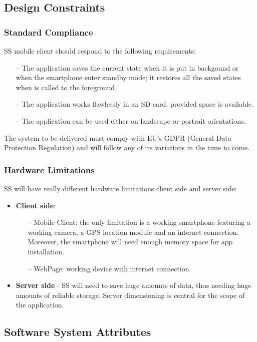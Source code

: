 \subsection{Design Constraints}
	\subsubsection{Standard Compliance}
	SS mobile client should respond to the following requirements:
	\begin{itemize}
		\item[--] The application saves the current state when it is put in backgound or when the smartphone enter standby mode; it restores all the saved states when is called to the foreground.
		\item[--] The application works flawlessly in an SD card, provided space is available.
		\item[--] The application can be used either on landscape or portrait orientations.
	\end{itemize}
	The system to be delivered must comply with EU's GDPR (General Data Protection Regulation) and will follow any of its variations in the time to come.
	\subsubsection{Hardware Limitations}
	SS will have really different hardware limitations client side and server side:
	\begin{itemize}
		\item \textbf{Client side}:
		\begin{itemize}
		 \item[--] Mobile Client: the only limitation is a working smartphone featuring a working camera, a GPS location module and an internet connection. Moreover, the smartphone will need enough memory space for app installation.
		 \item[--] WebPage: working device with internet connection.
		 \end{itemize}
		\item \textbf{Server side} - SS will need to save huge amounts of data, thus needing huge amounts of reliable storage. Server dimensioning is central for the scope of the application.
	\end{itemize}
	 
\subsection{Software System Attributes}
